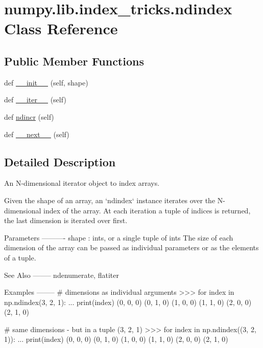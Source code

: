 \hypertarget{classnumpy_1_1lib_1_1index__tricks_1_1ndindex}{}\section{numpy.\+lib.\+index\+\_\+tricks.\+ndindex Class Reference}
\label{classnumpy_1_1lib_1_1index__tricks_1_1ndindex}
\subsection*{Public Member Functions}
\begin{DoxyCompactItemize}
\item 
def \hyperlink{classnumpy_1_1lib_1_1index__tricks_1_1ndindex_a00b83ede59b9058bc2ca48c36c2abd87}{\+\_\+\+\_\+init\+\_\+\+\_\+} (self, shape)
\item 
def \hyperlink{classnumpy_1_1lib_1_1index__tricks_1_1ndindex_a24e533575421a8f5a35fc3d530444e54}{\+\_\+\+\_\+iter\+\_\+\+\_\+} (self)
\item 
def \hyperlink{classnumpy_1_1lib_1_1index__tricks_1_1ndindex_a90e5b99598cf0164b5c0409049c51861}{ndincr} (self)
\item 
def \hyperlink{classnumpy_1_1lib_1_1index__tricks_1_1ndindex_a15882d2fe51484db60724b4a3df4759f}{\+\_\+\+\_\+next\+\_\+\+\_\+} (self)
\end{DoxyCompactItemize}


\subsection{Detailed Description}
\begin{DoxyVerb}An N-dimensional iterator object to index arrays.

Given the shape of an array, an `ndindex` instance iterates over
the N-dimensional index of the array. At each iteration a tuple
of indices is returned, the last dimension is iterated over first.

Parameters
----------
shape : ints, or a single tuple of ints
    The size of each dimension of the array can be passed as 
    individual parameters or as the elements of a tuple.

See Also
--------
ndenumerate, flatiter

Examples
--------
# dimensions as individual arguments
>>> for index in np.ndindex(3, 2, 1):
...     print(index)
(0, 0, 0)
(0, 1, 0)
(1, 0, 0)
(1, 1, 0)
(2, 0, 0)
(2, 1, 0)

# same dimensions - but in a tuple (3, 2, 1)
>>> for index in np.ndindex((3, 2, 1)):
...     print(index)
(0, 0, 0)
(0, 1, 0)
(1, 0, 0)
(1, 1, 0)
(2, 0, 0)
(2, 1, 0)\end{DoxyVerb}
 

